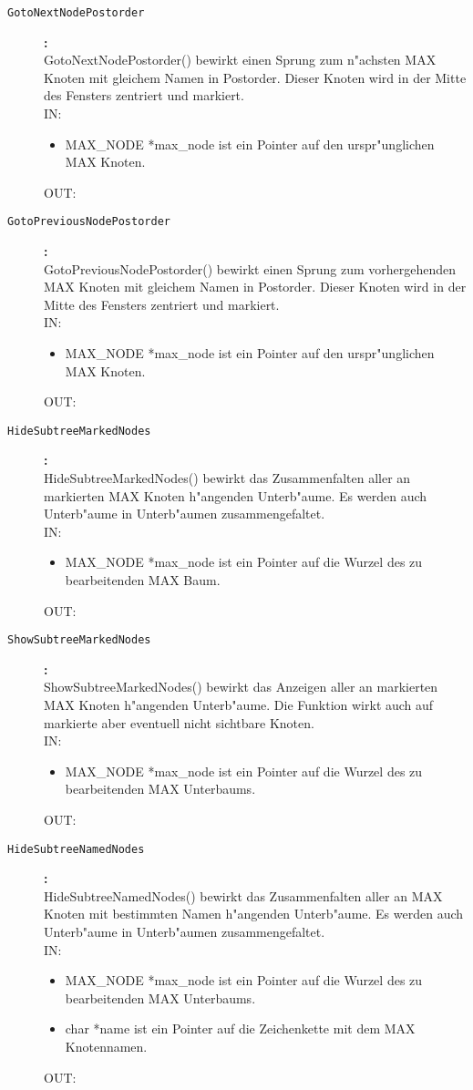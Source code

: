 \begin{description}
\item[\tt GotoNextNodePostorder]{\bf :\\}
GotoNextNodePostorder() bewirkt einen Sprung zum n"achsten MAX Knoten mit gleichem Namen in Postorder. Dieser Knoten wird in der Mitte des Fensters zentriert und markiert. \\
IN:
\begin{itemize}
   \item MAX\_NODE *max\_node ist ein Pointer auf den urspr"unglichen MAX Knoten.
\end{itemize}
OUT:

\item[\tt GotoPreviousNodePostorder]{\bf :\\}
GotoPreviousNodePostorder() bewirkt einen Sprung zum vorhergehenden MAX Knoten mit gleichem Namen in Postorder. Dieser Knoten wird in der Mitte des Fensters zentriert und markiert. \\
IN:
\begin{itemize}
   \item MAX\_NODE *max\_node ist ein Pointer auf den urspr"unglichen MAX Knoten.
\end{itemize}
OUT:

\item[\tt HideSubtreeMarkedNodes]{\bf :\\}
HideSubtreeMarkedNodes() bewirkt das Zusammenfalten aller an markierten MAX Knoten h"angenden Unterb"aume. Es werden auch Unterb"aume in Unterb"aumen zusammengefaltet. \\
IN:
\begin{itemize}
   \item MAX\_NODE *max\_node ist ein Pointer auf die Wurzel des zu bearbeitenden MAX Baum.
\end{itemize}
OUT:

\item[\tt ShowSubtreeMarkedNodes]{\bf :\\}
ShowSubtreeMarkedNodes() bewirkt das Anzeigen aller an markierten MAX Knoten h"angenden Unterb"aume. Die Funktion wirkt auch auf markierte aber eventuell nicht sichtbare Knoten. \\
IN:
\begin{itemize}
   \item MAX\_NODE *max\_node ist ein Pointer auf die Wurzel des zu bearbeitenden MAX Unterbaums.
\end{itemize}
OUT:

\item[\tt HideSubtreeNamedNodes]{\bf :\\}
HideSubtreeNamedNodes() bewirkt das Zusammenfalten aller an MAX Knoten mit bestimmten Namen h"angenden Unterb"aume. Es werden auch Unterb"aume in Unterb"aumen zusammengefaltet. \\
IN:
\begin{itemize}
   \item MAX\_NODE *max\_node ist ein Pointer auf die Wurzel des zu bearbeitenden MAX Unterbaums.
   \item char *name ist ein Pointer auf die Zeichenkette mit dem MAX Knotennamen.
\end{itemize}
OUT:


\end{description}
